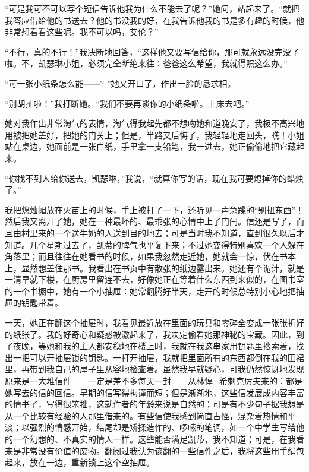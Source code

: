 \par “可是我可不可以写个短信告诉他我为什么不能去了呢？”她问，站起来了。“就把我答应借给他的书送去？他的书没我的好，在我告诉他我的书是多有趣的时候，他非常想看看这些呢。我不可以吗，艾伦？”
\par “不行，真的不行！”我决断地回答，“这样他又要写信给你，那可就永远没完没了啦。不，凯瑟琳小姐，必须完全断绝来往：爸爸这么希望，我就得照这么办。”
\par “可一张小纸条怎么能——? ”她又开口了，作出一脸的恳求相。
\par “别胡扯啦！”我打断她。“我们不要再谈你的小纸条啦。上床去吧。”
\par 她对我作出非常淘气的表情，淘气得我起先都不想吻她和道晚安了，我极不高兴地用被把她盖好，把她的门关上；但是，半路又后悔了，我轻轻地走回头，瞧！小姐站在桌边，她面前是一张白纸，手里拿一支铅笔，我一进去，她正偷偷地把它藏起来。
\par “你找不到人给你送去，凯瑟琳，”我说，“就算你写的话，现在我可要熄掉你的蜡烛了。”
\par 我把熄烛帽放在火苗上的时候，手上被打了一下，还听见一声急躁的“别扭东西”！然后我又离开了她，她在一种最坏的、最乖张的心情中上了门闩。信还是写了，而且由村里来的一个送牛奶的人送到目的地去；可是当时我不知道，直到很久以后才知道。几个星期过去了，凯蒂的脾气也平复下来；不过她变得特别喜欢一个人躲在角落里；而且往往在她看书的时候，如果我忽然走近她，她就会一惊，伏在书本上，显然想盖住那书。我看出在书页中有散张的纸边露出来。她还有个诡计，就是一清早就下楼，在厨房里留连不去，好像她正在等着什么东西到来似的，在图书室的一个书橱中，她有一个小抽屉：她常翻腾好半天，走开的时候总特别小心地把抽屉的钥匙带着。
\par 一天，她正在翻这个抽屉时，我看见最近放在里面的玩具和零碎全变成一张张折好的纸张了。我的好奇心和疑惑被激起来了，我决定偷看她那神秘的宝藏。因此，到了夜晚，等她和我的主人都安稳地在楼上时，我就在我这串家用钥匙里搜索着，找出一把可以开抽屉锁的钥匙。一打开抽屉，我就把里面所有的东西都倒在我的围裙里，再带到我自己的屋子里从容地检查着。虽然我早就疑心，可我仍然惊讶地发现原来是一大堆信件——一定是差不多每天一封——从林惇·希刺克厉夫来的：都是她写去的信的回信。早期的信写得拘谨而短；但是渐渐地，这些信发展成内容丰富的情书了，写得很笨拙，这就作者的年龄来说是自然的；可是有不少句子据我想是从一个比较有经验的人那里借来的。有些信使我感到简直古怪，混杂着热情和平淡；以强烈的情感开始，结尾却是矫揉造作的、啰嗦的笔调，如一个中学生写给他的一个幻想的、不真实的情人一样。这些能否满足凯蒂，我不知道；可是，在我看来是非常没有价值的废物。翻阅过我认为该翻的一些信件之后，我将这些用手绢包起来，放在一边，重新锁上这个空抽屉。
